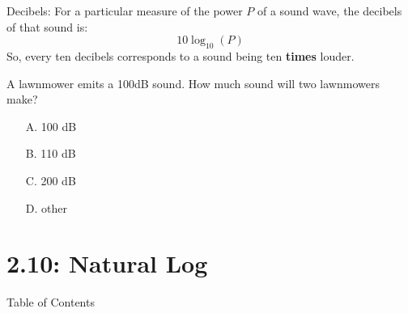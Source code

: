 \begin{frame}
Decibels: For a particular measure of the power $P$ of a sound wave, the decibels of that sound is:
\[10\log_{10}(P)\]
So, every ten decibels corresponds to a sound being ten \textbf{times} louder.\vfill

\color{C1}A lawnmower emits a 100dB sound. How much sound will two lawnmowers make?
\begin{itemize}
	\item[A.] 100 dB
	\item[B.] 110 dB
	\item[C.] 200 dB
	\item[D.] other \iftoggle{printsolutions}{\only<2-|handout:0>{$\checkmark$ \color{M4}more than 100, less than 110}}{}
\end{itemize}
\end{frame}

\section*{2.10: Natural Log}

\begin{frame}{Table of Contents}\label{210ln}
\mapofcontentsBB{\bk}
\end{frame}

